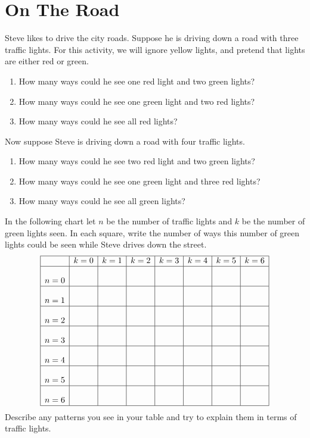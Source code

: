 \newpage
\section{On The Road}\label{A:traffic}


\begin{prob} 
Steve likes to drive the city roads. Suppose he is driving down a road
with three traffic lights. For this activity, we will ignore yellow
lights, and pretend that lights are either red or green.
\begin{enumerate}
\item How many ways could he see one red light and two green lights?
\item How many ways could he see one green light and two red lights?
\item How many ways could he see all red lights?
\end{enumerate}
\end{prob}

\begin{prob} 
Now suppose Steve is driving down a road with four traffic lights.
\begin{enumerate}
\item How many ways could he see two red light and two green lights?
\item How many ways could he see one green light and three red lights?
\item How many ways could he see all green lights?
\end{enumerate}
\end{prob}

\begin{prob} 
In the following chart let $n$ be the number of traffic
lights and $k$ be  the number of green lights seen. In each square, write the number of ways this number of green lights could be seen while Steve drives down the street.
\[
\begin{array}{|c|c|c|c|c|c|c|c|}
    \hline
          & k=0 & k=1 & k=2 & k=3 & k=4 & k=5 & k = 6\\
    \hline
    n=0 &\rule[0mm]{0mm}{7mm}&       &       &       &       &   &   \\
    \hline
    n=1 &\rule[0mm]{0mm}{7mm}  &       &       &       &       &   &   \\
    \hline
    n=2 & \rule[0mm]{0mm}{7mm} &     &     &       &       &    &  \\
    \hline
    n=3 &\rule[0mm]{0mm}{7mm}       &       &       &       &       &   &   \\
    \hline
    n=4 & \rule[0mm]{0mm}{7mm}      &       &       &       &       &   &   \\
    \hline
    n=5 &\rule[0mm]{0mm}{7mm}       &       &       &       &       &   &   \\
    \hline
    n=6 &\rule[0mm]{0mm}{7mm}       &       &       &       &       &   &   \\
    \hline
\end{array}
\]
Describe any patterns you see in your table and try to explain them in
terms of traffic lights.
\end{prob}
